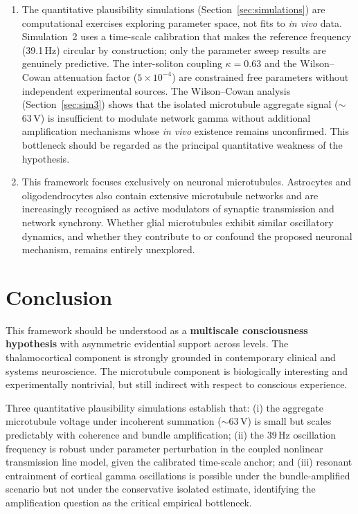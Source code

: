 \documentclass[10pt, a4paper, twocolumn]{article}
\begin{document}
\begin{enumerate}[label=(\arabic*)]
\item The quantitative plausibility simulations
(Section~\ref{sec:simulations}) are computational exercises exploring
parameter space, not fits to \emph{in vivo} data. Simulation~2
uses a time-scale calibration that makes the reference frequency
(39.1\,Hz) circular by construction; only the parameter sweep
results are genuinely predictive. The inter-soliton coupling
$\kappa = 0.63$ and the Wilson--Cowan attenuation factor
($5 \times 10^{-4}$) are constrained free parameters without
independent experimental sources. The Wilson--Cowan analysis
(Section~\ref{sec:sim3}) shows that the isolated microtubule
aggregate signal ($\sim$63\,\textmu V) is insufficient to modulate
network gamma without additional amplification mechanisms whose
\emph{in vivo} existence remains unconfirmed. This bottleneck
should be regarded as the principal quantitative weakness of the
hypothesis.

\item This framework focuses exclusively on neuronal
microtubules. Astrocytes and oligodendrocytes also contain
extensive microtubule networks and are increasingly recognised
as active modulators of synaptic transmission and network
synchrony. Whether glial microtubules exhibit similar
oscillatory dynamics, and whether they contribute to or
confound the proposed neuronal mechanism, remains entirely
unexplored.

\end{enumerate}

\section{Conclusion}

This framework should be understood as a \textbf{multiscale
consciousness hypothesis} with asymmetric evidential support across
levels. The thalamocortical component is strongly grounded in
contemporary clinical and systems neuroscience. The microtubule component
is biologically interesting and experimentally nontrivial, but still
indirect with respect to conscious experience.

Three quantitative plausibility simulations establish that: (i) the
aggregate microtubule voltage under incoherent summation
($\sim$63\,\textmu V) is small but scales predictably with coherence
and bundle amplification; (ii) the 39\,Hz oscillation frequency
is robust under parameter perturbation in the coupled nonlinear
transmission line model, given the calibrated time-scale anchor; and
(iii) resonant entrainment of cortical gamma oscillations is possible
under the bundle-amplified scenario but not under the conservative
isolated estimate, identifying the amplification question as the
critical empirical bottleneck.
\end{document}
